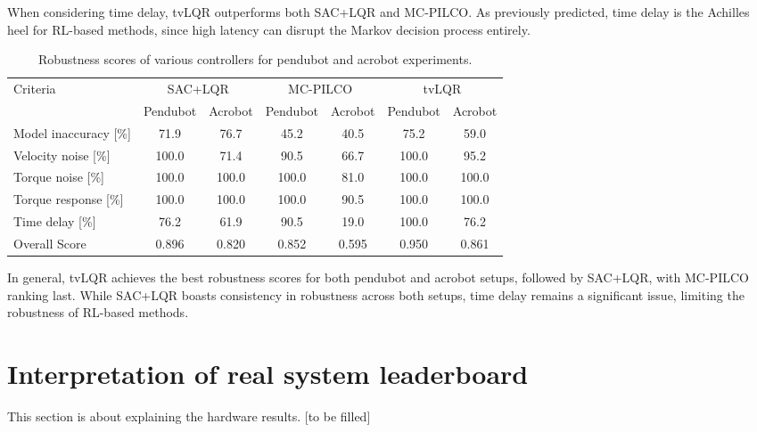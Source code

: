 When considering time delay, tvLQR outperforms both SAC+LQR and MC-PILCO. As previously predicted, time delay is the Achilles heel for RL-based methods, since high latency can disrupt the Markov decision process entirely.

\begin{table}[H]
  \centering
 \begin{tabular}{lcccccc}
 \hline
 Criteria & \multicolumn{2}{c}{SAC+LQR} & \multicolumn{2}{c}{MC-PILCO} & \multicolumn{2}{c}{tvLQR} \\
 & Pendubot & Acrobot & Pendubot & Acrobot & Pendubot & Acrobot \\
 \hline
 Model inaccuracy [\%] & 71.9 & 76.7 & 45.2 & 40.5 & 75.2 & 59.0 \\
 Velocity noise [\%] & 100.0 & 71.4 & 90.5 & 66.7 & 100.0 & 95.2 \\
 Torque noise [\%] & 100.0 & 100.0 & 100.0 & 81.0 & 100.0 & 100.0 \\
 Torque response [\%] & 100.0 & 100.0 & 100.0 & 90.5 & 100.0 & 100.0 \\
 Time delay [\%] & 76.2 & 61.9 & 90.5 & 19.0 & 100.0 & 76.2 \\
 Overall Score & 0.896 & 0.820 & 0.852 & 0.595 & 0.950 & 0.861 \\
 \hline
 \end{tabular}
 \caption{Robustness scores of various controllers for pendubot and acrobot experiments.}
 \label{tab:robustness}
\end{table}

In general, tvLQR achieves the best robustness scores for both pendubot and acrobot setups, followed by SAC+LQR, with MC-PILCO ranking last. While SAC+LQR boasts consistency in robustness across both setups, time delay remains a significant issue, limiting the robustness of RL-based methods.

\section{Interpretation of real system leaderboard}
This section is about explaining the hardware results. [to be filled]


